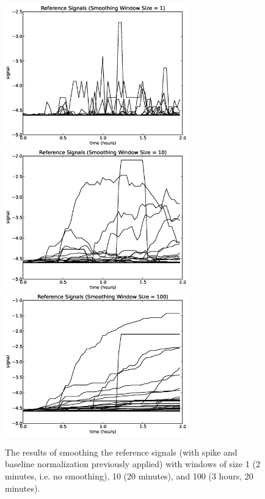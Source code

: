 \begin{figure}[h!]
\begin{center}
\includegraphics[width=3.10in]{../fig/final/signal_transform/smooth_1.eps}\includegraphics[width=3.10in]{../fig/final/signal_transform/smooth_10.eps}
\includegraphics[width=3.10in]{../fig/final/signal_transform/smooth_100.eps}
\end{center}
\caption{\label{fig:smooth} The results of smoothing the reference signals (with spike and baseline normalization previously applied) with windows of size 1 (2 minutes, i.e. no smoothing), 10 (20 minutes), and 100 (3 hours, 20 minutes).}
\end{figure}

